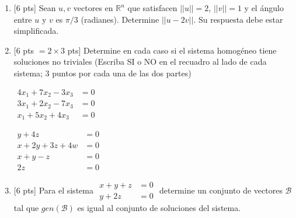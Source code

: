 \documentclass[11pt]{article}
\newcommand{\casillasino}{\fbox{\phantom{XX}}}
\begin{document}
\begin{enumerate}
\item{}[6 pts] Sean $u, v$ vectores en $\mathbb{R}^n$ que satisfacen $||u||=2$, $||v||=1$ y el ángulo entre $u$ y $v$ es $\pi/3$ (radianes). Determine $||u-2v||$. Su respuesta debe estar simplificada.

\vspace{4pt}

\item{}[6 pts $=2\times 3$ pts] Determine en cada caso si el sistema homogéneo tiene soluciones no triviales (Escriba SI o NO en el recuadro al lado de cada sistema; 3 puntos por cada una de las dos partes)

\vspace{6pt}
\noindent
\begin{minipage}[t]{0.46\linewidth}
$\begin{aligned}
4x_1+7x_2-3x_3 &=0\\
3x_1+2x_2-7x_3 &=0\\
x_1+5x_2+4x_3 &=0
\end{aligned}$
\end{minipage}%
\hfill\casillasino\hfill
\begin{minipage}[t]{0.36\linewidth}
$\begin{aligned}
y+4z\qquad\quad &=0\\
x+2y+3z+4w &=0\\
x+y-z\qquad &=0\\
2z\qquad\qquad\quad &=0
\end{aligned}$
\end{minipage}%
\hfill\casillasino

\item{}[6 pts] Para el sistema $\begin{aligned}x+y+z&=0\\ y+2z&=0\end{aligned}$ determine un conjunto de vectores $\mathcal{B}$ tal que $gen(\mathcal{B})$ es igual al conjunto de soluciones del sistema.

\vspace{4pt}


\end{enumerate}
\end{document}
